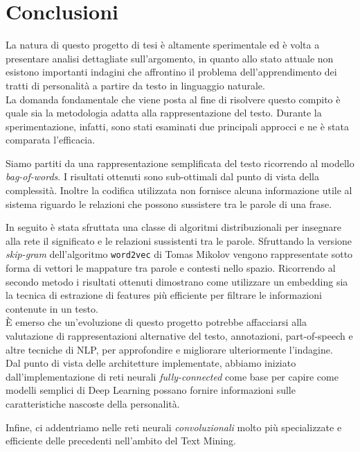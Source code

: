 \chapter{Conclusioni}
\label{chap:conclusioni}

La natura di questo progetto di tesi è altamente sperimentale ed è volta a presentare analisi dettagliate sull'argomento, in quanto allo stato attuale non esistono importanti indagini che affrontino il problema dell'apprendimento dei tratti di personalità a partire da testo in linguaggio naturale.
\\

La domanda fondamentale che viene posta al fine di risolvere questo compito è quale sia la metodologia adatta alla rappresentazione del testo.
Durante la sperimentazione, infatti, sono stati esaminati due principali approcci e ne è stata comparata l'efficacia.

Siamo partiti da una rappresentazione semplificata del testo ricorrendo al modello \emph{bag-of-words}. 
I risultati ottenuti sono sub-ottimali dal punto di vista della complessità. Inoltre la codifica utilizzata non fornisce alcuna informazione utile al sistema riguardo le relazioni che possono sussistere tra le parole di una frase.

In seguito è stata sfruttata una classe di algoritmi distribuzionali per insegnare alla rete il significato e le relazioni sussistenti tra le parole. Sfruttando la versione \emph{skip-gram} dell'algoritmo \texttt{word2vec} di Tomas Mikolov vengono rappresentate sotto forma di vettori le mappature tra parole e contesti nello spazio. 
Ricorrendo al secondo metodo i risultati ottenuti dimostrano come utilizzare un embedding sia la tecnica di estrazione di features più efficiente per filtrare le informazioni contenute in un testo.\\

È emerso che un'evoluzione di questo progetto potrebbe affacciarsi alla valutazione di rappresentazioni alternative del testo, annotazioni, part-of-speech \cite{brown1957linguistic} e altre tecniche di NLP, per approfondire e migliorare ulteriormente l'indagine.\\

Dal punto di vista delle architetture implementate, abbiamo iniziato dall'implementazione di reti neurali \emph{fully-connected} come base per capire come modelli semplici di Deep Learning possano fornire informazioni sulle caratteristiche nascoste della personalità. 

Infine, ci addentriamo nelle reti neurali \emph{convoluzionali} molto più specializzate e efficiente delle precedenti nell'ambito del Text Mining.

